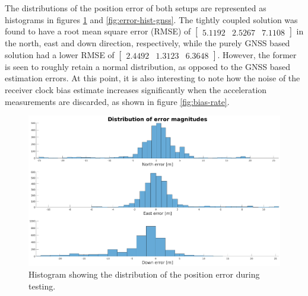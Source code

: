     The distributions of the position error of both setups are represented as histograms in figures \ref{fig:error-hist} and \ref{fig:error-hist-gnss}. The tightly coupled solution was found to have a root mean square error (RMSE) of $\begin{bmatrix} 5.1192 & 2.5267 & 7.1108\end{bmatrix}$ in the north, east and down direction, respectively, while the purely GNSS based solution had a lower RMSE of $\begin{bmatrix}2.4492 & 1.3123 & 6.3648 \end{bmatrix}$. However, the former is seen to roughly retain a normal distribution, as opposed to the GNSS based estimation errors. At this point, it is also interesting to note how the noise of the receiver clock bias estimate increases significantly when the acceleration measurements are discarded, as shown in figure \ref{fig:bias-rate}.\\
    
    \begin{figure}[!htbp]
        \hspace{-1.5cm}
        \includegraphics[scale=0.3]{Results/Images/error-hist.eps}
        \caption{Histogram showing the distribution of the position error during testing.}
        \label{fig:error-hist}
    \end{figure}
    
